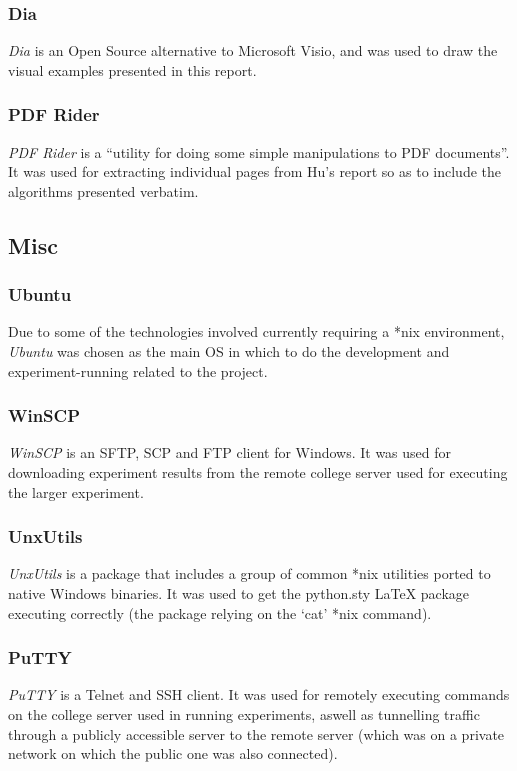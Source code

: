 \documentclass[a4paper,11pt]{report}
\begin{document}
\subsubsection*{Dia}
\emph{Dia} \citep{prog:dia} is an Open Source alternative to Microsoft Visio, and was used to draw the visual examples presented in this report.

\subsubsection*{PDF Rider}
\emph{PDF Rider} \citep{prog:pdfrider} is a ``utility for doing some simple manipulations to PDF documents''. It was used for extracting individual pages from Hu's report so as to include the algorithms presented verbatim.

\subsection{Misc}

\subsubsection*{Ubuntu}
Due to some of the technologies involved currently requiring a *nix environment, \emph{Ubuntu} \citep{prog:ubuntu} was chosen as the main OS in which to do the development and experiment-running related to the project.

\subsubsection*{WinSCP}
\emph{WinSCP} \citep{prog:winscp} is an SFTP, SCP and FTP client for Windows. It was used for downloading experiment results from the remote college server used for executing the larger experiment.

\subsubsection*{UnxUtils}
\emph{UnxUtils} \citep{prog:unxutils} is a package that includes a group of common *nix utilities ported to native Windows binaries. It was used to get the python.sty \LaTeX{} package executing correctly (the package relying on the `cat' *nix command).

\subsubsection*{PuTTY}
\emph{PuTTY} \citep{prog:putty} is a Telnet and SSH client. It was used for remotely executing commands on the college server used in running experiments, aswell as tunnelling traffic through a publicly accessible server to the remote server (which was on a private network on which the public one was also connected).
\end{document}
